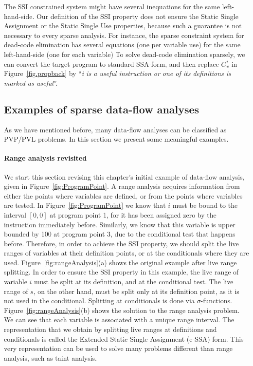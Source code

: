 The SSI constrained system might have several inequations for the same left-hand-side.
Our definition of the SSI property does not ensure the Static Single Assignment or the Static Single Use properties, because such a guarantee is not necessary to every sparse analysis.
For instance, the sparse constraint system for dead-code elimination has several equations (one per variable use) for the same left-hand-side (one for each variable)
To solve dead-code elimination sparsely, we can convert the target program to standard SSA-form, and then replace $G_v^i$ in Figure~\ref{fig.propback} by ``\emph{i is a useful instruction or one of its definitions is marked as useful}''. 

\subsection{Examples of sparse data-flow analyses}
\label{sub:examples}

As we have mentioned before, many data-flow analyses can be classified as PVP/PVL problems.
In this section we present some meaningful examples.

\paragraph{Range analysis revisited}
We start this section revising this chapter's initial example of data-flow analysis, given in Figure~\ref{fig:ProgramPoint}.
A range analysis acquires information from either the points where variables are defined, or from the points where variables are tested.
In Figure~\ref{fig:ProgramPoint} we know that $i$ must be bound to the interval $[0, 0]$ at program point 1, for it has been assigned zero by the instruction immediately before.
Similarly, we know that this variable is upper bounded by 100 at program point 3, due to the conditional test that happens before.
Therefore, in order to achieve the SSI property, we should split the live ranges of variables at their definition points, or at the conditionals where they are used.
Figure~\ref{fig:rangeAnalysis}(a) shows the original example after live range splitting.
In order to ensure the SSI property in this example, the live range of variable $i$ must be split at its definition, and at the conditional test.
The live range of $s$, on the other hand, must be split only at its definition point, as it is not used in the conditional.
Splitting at conditionals is done via $\sigma$-functions.
Figure~\ref{fig:rangeAnalysis}(b) shows the solution to the range analysis problem.
We can see that each variable is associated with a unique range interval.
The representation that we obtain by splitting live ranges at definitions and conditionals is called the Extended Static Single Assignment (e-SSA) form.
This very representation can be used to solve many problems different than range analysis, such as taint analysis.

